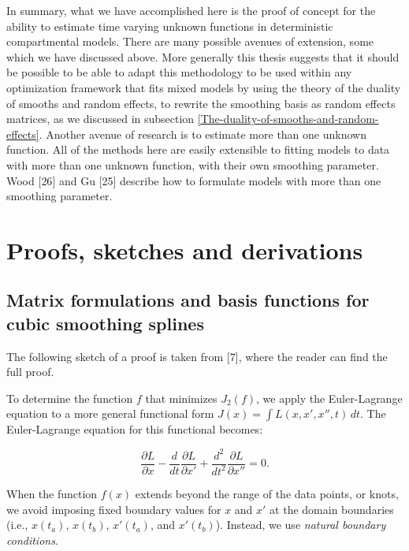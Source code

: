 \documentclass[
11pt, %
oneside, %
english, %
singlespacing, %
]{macthesis} %
\begin{document}
In summary, what we have accomplished here is the proof of concept for the ability to estimate time varying unknown functions in deterministic compartmental models. There are many possible avenues of extension, some which we have discussed above. More generally this thesis suggests that it should be possible to be able to adapt this methodology to be used within any optimization framework that fits mixed models by using the theory of the duality of smooths and random effects, to rewrite the smoothing basis as random effects matrices, as we discussed in subsection \ref{The-duality-of-smooths-and-random-effects}. Another avenue of research is to estimate more than one unknown function. All of the methods here are easily extensible to fitting models to data with more than one unknown function, with their own smoothing parameter. Wood {[}26{]} and Gu {[}25{]} describe how to formulate models with more than one smoothing parameter.

\appendix

\chapter{Proofs, sketches and derivations}\label{Appendix}

\section{Matrix formulations and basis functions for cubic smoothing splines}\label{A1}

The following sketch of a proof is taken from {[}7{]}, where the reader can find the full proof.

To determine the function \(f\) that minimizes \(J_2(f)\), we apply the Euler-Lagrange equation to a more general functional form \(J(x) = \int L(x, x', x'', t) \, dt\). The Euler-Lagrange equation for this functional becomes:

\begin{equation}
\frac{\partial L}{\partial x} - \frac{d}{dt} \frac{\partial L}{\partial x'} + \frac{d^2}{dt^2} \frac{\partial L}{\partial x''} = 0.
\label{eq:expanded Euler-Lagrange equation}
\end{equation}

When the function \(f(x)\) extends beyond the range of the data points, or knots, we avoid imposing fixed boundary values for \(x\) and \(x'\) at the domain boundaries (i.e., \(x(t_a)\), \(x(t_b)\), \(x'(t_a)\), and \(x'(t_b)\)). Instead, we use \emph{natural boundary conditions}.
\end{document}
